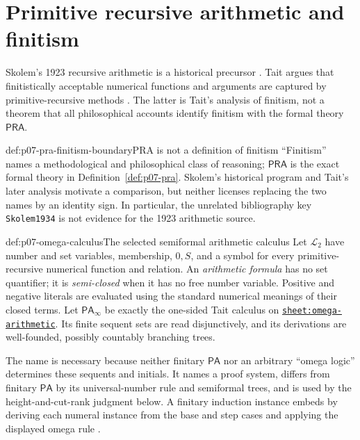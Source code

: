 \section{Primitive recursive arithmetic and finitism}
\label{sec:p07-pra-finitism}

Skolem's 1923 recursive arithmetic is a historical precursor
\cite{Skolem1923}.  Tait argues that finitistically acceptable numerical
functions and arguments are captured by primitive-recursive methods
\cite{Tait1981}.  The latter is Tait's analysis of finitism, not a theorem
that all philosophical accounts identify finitism with the formal theory
\(\mathsf{PRA}\).

\begin{hbwarning}{def:p07-pra-finitism-boundary}{PRA is not a definition of finitism}
``Finitism'' names a methodological and philosophical class of reasoning;
\(\mathsf{PRA}\) is the exact formal theory in
Definition~\ref{def:p07-pra}.  Skolem's historical program and Tait's later
analysis motivate a comparison, but neither licenses replacing the two names
by an identity sign.  In particular, the unrelated bibliography key
\texttt{Skolem1934} is not evidence for the 1923 arithmetic source.
\end{hbwarning}

\begin{hbdefinition}{def:p07-omega-calculus}{The selected semiformal arithmetic calculus}
Let \(\mathcal L_2\) have number and set variables, membership, \(0,S\), and a
symbol for every primitive-recursive numerical function and relation.  An
\emph{arithmetic formula} has no set quantifier; it is \emph{semi-closed} when
it has no free number variable.  Positive and negative literals are evaluated
using the standard numerical meanings of their closed terms.  Let
\(\mathsf{PA}_{\infty}\) be exactly the one-sided Tait calculus on
\hyperref[sheet:omega-arithmetic]{\texttt{sheet:omega-arithmetic}}.  Its finite
sequent sets are read disjunctively, and its derivations are well-founded,
possibly countably branching trees.

The name is necessary because neither finitary \(\mathsf{PA}\) nor an arbitrary
``omega logic'' determines these sequents and initials.  It names a proof
system, differs from finitary \(\mathsf{PA}\) by its universal-number rule and
semiformal trees, and is used by the height-and-cut-rank judgment below.  A
finitary induction instance embeds by deriving each numeral instance from the
base and step cases and applying the displayed omega rule
\cite{Schuette1977,JagerProbst2004}.
\end{hbdefinition}

